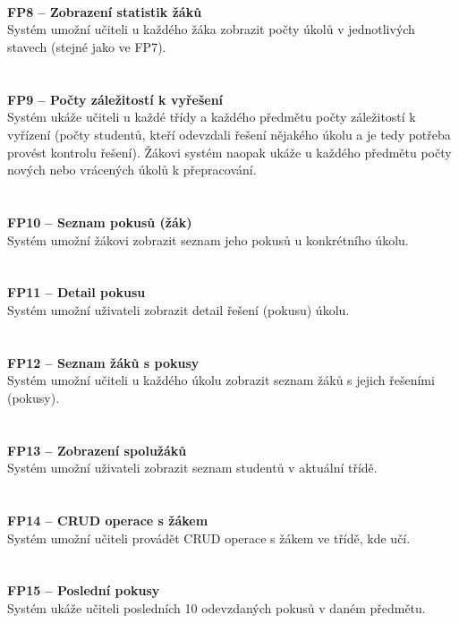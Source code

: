 \documentclass[twoside]{ctuthesis}
\theoremstyle{plain}
\theoremstyle{definition}
\theoremstyle{note}
\begin{document}
\\\\\\
\textbf{\Large FP8 -- Zobrazení statistik žáků}\\
Systém umožní učiteli u každého žáka zobrazit počty úkolů v jednotlivých stavech (stejné jako ve FP7).
\\\\\\
\textbf{\Large FP9 -- Počty záležitostí k vyřešení}\\
Systém ukáže učiteli u každé třídy a každého předmětu počty záležitostí k vyřízení (počty studentů, kteří odevzdali řešení nějakého úkolu a je tedy potřeba provést kontrolu řešení). Žákovi systém naopak ukáže u každého předmětu počty nových nebo vrácených úkolů k přepracování.
\\\\\\
\textbf{\Large FP10 -- Seznam pokusů (žák)}\\
Systém umožní žákovi zobrazit seznam jeho pokusů u konkrétního úkolu.
\\\\\\
\textbf{\Large FP11 -- Detail pokusu}\\
Systém umožní uživateli zobrazit detail řešení (pokusu) úkolu.
\\\\\\
\textbf{\Large FP12 -- Seznam žáků s pokusy}\\
Systém umožní učiteli u každého úkolu zobrazit seznam žáků s jejich řešeními (pokusy). 
\\\\\\
\textbf{\Large FP13 -- Zobrazení spolužáků}\\
Systém umožní uživateli zobrazit seznam studentů v aktuální třídě.
\\\\\\
\textbf{\Large FP14 -- CRUD operace s žákem}\\
Systém umožní učiteli provádět CRUD operace s žákem ve třídě, kde učí.
\\\\\\
\textbf{\Large FP15 -- Poslední pokusy}\\
Systém ukáže učiteli posledních 10 odevzdaných pokusů v daném předmětu.
\\\\\\
\end{document}
